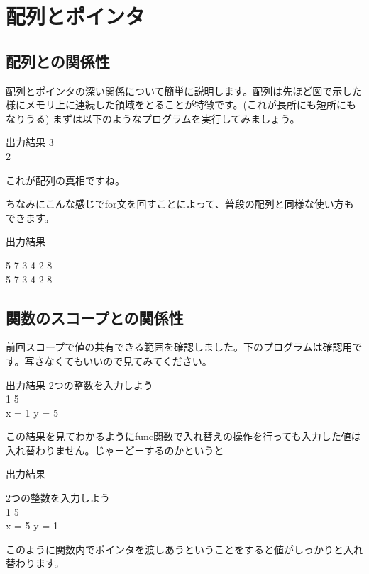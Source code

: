 \section{配列とポインタ}

\subsection{配列との関係性}
配列とポインタの深い関係について簡単に説明します。配列は先ほど図で示した様にメモリ上に連続した領域をとることが特徴です。(これが長所にも短所にもなりうる)
まずは以下のようなプログラムを実行してみましょう。



\begin{itembox}{出力結果}
3\\
2

\end{itembox}
これが配列の真相ですね。

ちなみにこんな感じでfor文を回すことによって、普段の配列と同様な使い方もできます。


\begin{itembox}{出力結果}

5 7 3 4 2 8\\
5 7 3 4 2 8
\end{itembox}

\subsection{関数のスコープとの関係性}
前回スコープで値の共有できる範囲を確認しました。下のプログラムは確認用です。写さなくてもいいので見てみてください。



\begin{itembox}{出力結果}
2つの整数を入力しよう\\
1 5\\
x = 1 y = 5

\end{itembox}
この結果を見てわかるようにfunc関数で入れ替えの操作を行っても入力した値は入れ替わりません。じゃーどーするのかというと



\begin{itembox}{出力結果}

2つの整数を入力しよう\\
1 5\\
x = 5 y = 1
\end{itembox}
このように関数内でポインタを渡しあうということをすると値がしっかりと入れ替わります。

